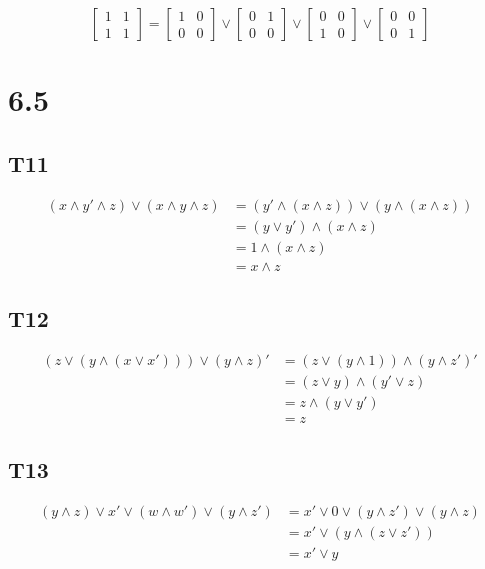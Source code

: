 \documentclass{article}
\begin{document}
$$
\begin{bmatrix}
    1 & 1\\
    1 & 1
\end{bmatrix}
=
\begin{bmatrix}
    1 & 0\\
    0 & 0
\end{bmatrix}
\lor
\begin{bmatrix}
    0 & 1\\
    0 & 0
\end{bmatrix}
\lor
\begin{bmatrix}
    0 & 0\\
    1 & 0
\end{bmatrix}
\lor
\begin{bmatrix}
    0 & 0\\
    0 & 1
\end{bmatrix}
$$
\section{6.5}
\subsection{T11}
\begin{align*}
    (x \land y' \land z) \lor (x \land y \land z) &= (y' \land (x \land z)) \lor (y \land (x \land z))\\
    &= (y \lor y') \land (x \land z)\\
    &= 1 \land (x \land z)\\
    &= x \land z
\end{align*}
\subsection{T12}
\begin{align*}
    (z \lor (y \land (x \lor x'))) \lor (y \land z)' &= (z \lor (y \land 1)) \land (y \land z')'\\
    &= (z \lor y) \land (y' \lor z)\\
    &= z \land (y \lor y')\\
    &= z
\end{align*}
\subsection{T13}
\begin{align*}
    (y \land z) \lor x' \lor (w \land w') \lor (y \land z') &= x' \lor 0 \lor (y \land z') \lor (y \land z)\\
    &= x' \lor (y \land (z \lor z'))\\
    &= x' \lor y
\end{align*}
\end{document}
